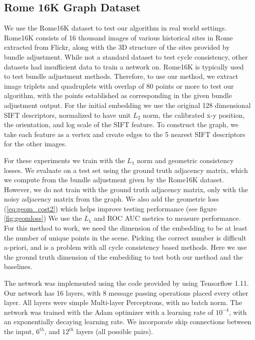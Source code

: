 \documentclass{article} %
\begin{document}
\subsection{Rome 16K Graph Dataset}
We  use the Rome16K dataset \cite{li2010location} to test our algorithm in real world settings.
Rome16K consists of 16 thousand images of various historical sites in Rome extracted from Flickr, along with the 3D structure of the sites provided by bundle adjustment.
While not a standard dataset to test cycle consistency, other datasets had insufficient data to train a network on.
Rome16K is typically used to test bundle adjustment methods.
Therefore, to use our method, we extract image triplets and quadruplets with overlap of 80 points or more to test our algorithm, with the points established as corresponding in the given bundle adjustment output.
For the initial embedding we use the original 128 dimensional SIFT descriptors, normalized to have unit $L_2$ norm, the calibrated x-y position, the orientation, and log scale of the SIFT feature.
To construct the graph, we take each feature as a vertex and create edges to the 5 nearest SIFT descriptors for the other images.

For these experiments we train with the $L_1$ norm and geometric consistency losses.
We evaluate on a test set using the ground truth adjacency matrix, which we compute from the bundle adjustment given by the Rome16K dataset.
However, we do not train with the ground truth adjacency matrix, only with the noisy adjacency matrix from the graph.
We also add the geometric loss (\ref{eq:geom_cost2}) which helps improve testing performance (see figure \ref{fig:geomloss})
We use the $L_1$ and ROC AUC metrics to measure performance.
For this method to work, we need the dimension of the embedding to be at least the number of unique points in the scene.
Picking the correct number is difficult a-priori, and is a problem with all cycle consistency based methods.
Here we use the ground truth dimension of the embedding to test both our method and the baselines.

The network was implemented using the code provided by \cite{battaglia2018relational} using Tensorflow \cite{tensorflow2015} 1.11.
Our network has 16 layers, with 8 message passing operations placed every other layer.
All layers were simple Multi-layer Perceptrons, with no batch norm.
The network was trained with the Adam optimizer \cite{kingma2014adam} with a learning rate of $10^{-4}$, with an exponentially decaying learning rate.
We incorporate skip connections between the input, $6^{th}$, and $12^{th}$ layers (all possible pairs). 
\end{document}
